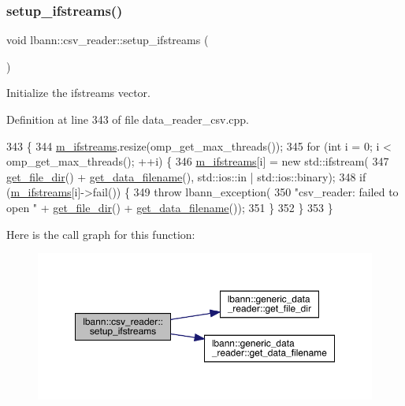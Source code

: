 \subsubsection{\texorpdfstring{setup\+\_\+ifstreams()}{setup\_ifstreams()}}
{\footnotesize\ttfamily void lbann\+::csv\+\_\+reader\+::setup\+\_\+ifstreams (\begin{DoxyParamCaption}{ }\end{DoxyParamCaption})\hspace{0.3cm}{\ttfamily [protected]}}



Initialize the ifstreams vector. 



Definition at line 343 of file data\+\_\+reader\+\_\+csv.\+cpp.


\begin{DoxyCode}
343                                  \{
344   \hyperlink{classlbann_1_1csv__reader_a41ede08dd2ed420bf8f6c6670d892caf}{m\_ifstreams}.resize(omp\_get\_max\_threads());
345   \textcolor{keywordflow}{for} (\textcolor{keywordtype}{int} i = 0; i < omp\_get\_max\_threads(); ++i) \{
346     \hyperlink{classlbann_1_1csv__reader_a41ede08dd2ed420bf8f6c6670d892caf}{m\_ifstreams}[i] = \textcolor{keyword}{new} std::ifstream(
347       \hyperlink{classlbann_1_1generic__data__reader_ab4c6c2d4ba40ece809ce896828c8ff03}{get\_file\_dir}() + \hyperlink{classlbann_1_1generic__data__reader_a56664e1b43f3fe923cf6d652f14b40a9}{get\_data\_filename}(), std::ios::in | std::ios::binary);
348     \textcolor{keywordflow}{if} (\hyperlink{classlbann_1_1csv__reader_a41ede08dd2ed420bf8f6c6670d892caf}{m\_ifstreams}[i]->fail()) \{
349       \textcolor{keywordflow}{throw} lbann\_exception(
350         \textcolor{stringliteral}{"csv\_reader: failed to open "} + \hyperlink{classlbann_1_1generic__data__reader_ab4c6c2d4ba40ece809ce896828c8ff03}{get\_file\_dir}() + 
      \hyperlink{classlbann_1_1generic__data__reader_a56664e1b43f3fe923cf6d652f14b40a9}{get\_data\_filename}());
351     \}
352   \}
353 \}
\end{DoxyCode}
Here is the call graph for this function\+:\nopagebreak
\begin{figure}[H]
\begin{center}
\leavevmode
\includegraphics[width=350pt]{classlbann_1_1csv__reader_afc689f206192339770ee9fbd132492bb_cgraph}
\end{center}
\end{figure}
